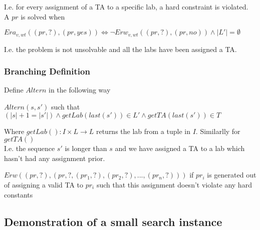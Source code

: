 \documentclass{article}
\begin{document}
I.e. for every assignment of a TA to a specific lab, a hard constraint
is violated.\\

A $pr$ is solved when\\

\begin{center}
  $Era_{v,wt}((pr, ?),(pr, yes)) \iff \lnot Erw_{v,wt}((pr, ?),(pr,
  no)) \land |L'| = \emptyset$

\end{center}

I.e. the problem is not unsolvable and all the labs have been assigned
a TA.

\subsubsection{Branching Definition}

Define $Altern$ in the following way 

\begin{center}
  $Altern(s, s')$ such that $(|s| + 1 = |s'|) \land getLab(last(s')) \in
  L' \land getTA(last(s')) \in T$ 
\end{center}

Where $getLab() : I \times L \rightarrow L$ returns the lab from a
tuple in $I$. Similarlly for $getTA()$\\

I.e. the sequence $s'$ is longer than $s$ and we have assigned a TA to a lab
which hasn't had any assignment prior.

\begin{center}
  $Erw((pr, ?), (pr, ?, (pr_1, ?), (pr_2, ?), ... , (pr_n, ?)))$ if $pr_i$
  is generated out of assigning a valid TA to $pr_i$ such that this
  assignment doesn't violate any hard constants
\end{center}

\subsection{Demonstration of a small search instance}
\end{document}
